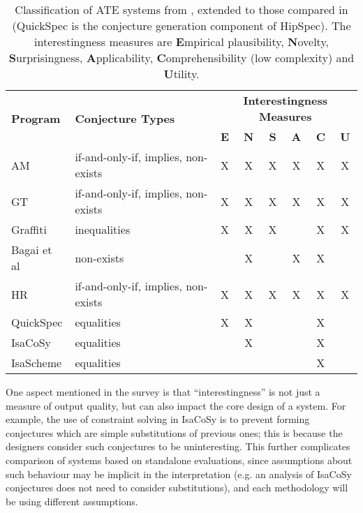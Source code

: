 \begin{table}
  \begin{center}
    \begin{tabular}{ |l|l|c|c|c|c|c|c| }
      \hline
      \multirow{2}{*}{\textbf{Program}}                 &
      \multirow{2}{*}{\textbf{Conjecture Types}}        &
      \multicolumn{6}{c}{\textbf{Interestingness Measures}} \\
      \hhline{~~------}
         & & \textbf{E} & \textbf{N} & \textbf{S} & \textbf{A} & \textbf{C} & \textbf{U} \\

      \hline
      AM          & if-and-only-if, implies, non-exists & X & X & X & X & X & X \\ \hline
      GT          & if-and-only-if, implies, non-exists & X & X & X & X & X & X \\ \hline
      Graffiti    & inequalities                        & X & X & X &   & X & X \\ \hline
      Bagai et al & non-exists                          &   & X &   & X & X &   \\ \hline
      HR          & if-and-only-if, implies, non-exists & X & X & X & X & X & X \\ \hline
      QuickSpec   & equalities                          & X & X &   &   & X &   \\ \hline
      IsaCoSy     & equalities                          &   & X &   &   & X &   \\ \hline
      IsaScheme   & equalities                          &   &   &   &   & X &   \\ \hline
    \end{tabular}
  \end{center}
  \caption{Classification of ATE systems from \cite{colton2000notion}, extended
    to those compared in \cite{claessen2013automating} (QuickSpec is the
    conjecture generation component of HipSpec). The interestingness measures
    are \textbf{E}mpirical plausibility, \textbf{N}ovelty,
    \textbf{S}urprisingness, \textbf{A}pplicability, \textbf{C}omprehensibility
    (low complexity) and \textbf{U}tility.}
  \label{table:colton}
\end{table}

One aspect mentioned in the survey is that ``interestingness'' is not just a
measure of output quality, but can also impact the core design of a system. For
example, the use of constraint solving in IsaCoSy is to prevent forming
conjectures which are simple substitutions of previous ones; this is because the
designers consider such conjectures to be uninteresting. This further
complicates comparison of systems based on standalone evaluations, since
assumptions about such behaviour may be implicit in the interpretation (e.g. an
analysis of IsaCoSy conjectures does not need to consider substitutions), and
each methodology will be using different assumptions.

